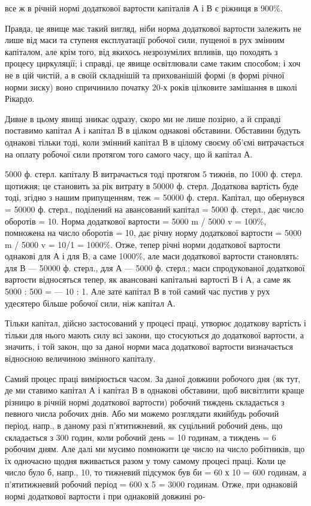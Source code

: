 все ж в річній нормі додаткової вартости капіталів А і В є ріжниця в
900\%.

Правда, це явище має такий вигляд, ніби норма додаткової вартости
залежить не лише від маси та ступеня експлуатації робочої сили,
пущеної в рух змінним капіталом, але крім того, від якихось незрозумілих
впливів, що походять з процесу циркуляції; і справді, це явище
освітлювали саме таким способом; і хоч не в цій чистій, а в своїй складнішій
та прихованішій формі (в формі річної норми зиску) воно спричинило
початку 20-х років цілковите замішання в школі Рікардо.

Дивне в цьому явищі зникає одразу, скоро ми не лише позірно, а
й справді поставимо капітал А і капітал В в цілком однакові обставини.
Обставини будуть однакові тільки тоді, коли змінний капітал В в цілому
своєму об’ємі витрачається на оплату робочої сили протягом того
самого часу, що й капітал А.

5000 ф. стерл. капіталу В витрачається тоді протягом 5 тижнів, по
1000 ф. стерл. щотижня; це становить за рік витрату в 50000 ф. стерл.
Додаткова вартість буде тоді, згідно з нашим припущенням, теж = 50000
ф. стерл. Капітал, що обернувся = 50000 ф. стерл., поділений на авансований
капітал = 5000 ф. стерл., дає число оборотів = 10. Норма додаткової
вартости = 5000 m / 5000 v = 100\%, помножена на число оборотів = 10, дає річну норму додаткової
вартости = 5000 m / 5000 v = 10/1 = 1000\%. Отже, тепер річні норми додаткової вартости однакові для
А і для В, а саме
1000\%, але маси додаткової вартости становлять: для В — 50000 ф. стерл.,
для А — 5000 ф. стерл.; маси спродукованої додаткової вартости відносяться
тепер, як авансовані капітальні вартості В і А, а саме як 5000 : 500 =
— 10 : 1. Але зате капітал В в той самий час пустив у рух удесятеро
більше робочої сили, ніж капітал А.

Тільки капітал, дійсно застосований у процесі праці, утворює додаткову
вартість і тільки для нього мають силу всі закони, що стосуються
до додаткової вартости, а значить, і той закон, що за даної норми маса
додаткової вартости визначається відносною величиною змінного капіталу.

Самий процес праці вимірюється часом. За даної довжини робочого
дня (як тут, де ми ставимо капітал А і капітал В в однакові обставини,
щоб висвітлити краще різницю в річній нормі додаткової вартости)
робочий тиждень складається з певного числа робочих днів. Або ми
можемо розглядати якийбудь робочий період, напр., в даному разі п’ятитижневий,
як суцільний робочий день, що складається з 300 годин, коли
робочий день = 10 годинам, а тиждень = 6 робочим дням. Але далі ми
мусимо помножити це число на число робітників, що їх одночасно щодня
вживається разом у тому самому процесі праці. Коли це число
було б, напр., 10, то тижневий підсумок був би = 60 х 10 = 600 годинам,
а п’ятитижневий робочий період = 600 х 5 = 3000 годинам. Отже,
при однаковій нормі додаткової вартости і при однаковій довжині ро-
